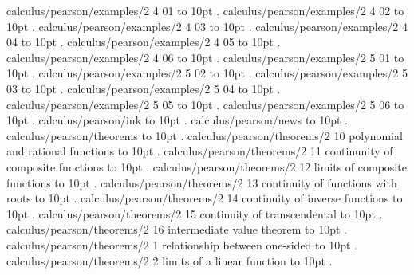 \smallskip
\par\endgroup
\bigskip
calculus/pearson/examples/2 4 01 \leaders\hbox to 10pt {\hss.\hss}  \hfill {}
\smallskip
calculus/pearson/examples/2 4 02 \leaders\hbox to 10pt {\hss.\hss}  \hfill {}
\smallskip
calculus/pearson/examples/2 4 03 \leaders\hbox to 10pt {\hss.\hss}  \hfill {}
\smallskip
calculus/pearson/examples/2 4 04 \leaders\hbox to 10pt {\hss.\hss}  \hfill {}
\smallskip
calculus/pearson/examples/2 4 05 \leaders\hbox to 10pt {\hss.\hss}  \hfill {}
\smallskip
calculus/pearson/examples/2 4 06 \leaders\hbox to 10pt {\hss.\hss}  \hfill {}
\smallskip
calculus/pearson/examples/2 5 01 \leaders\hbox to 10pt {\hss.\hss}  \hfill {}
\smallskip
calculus/pearson/examples/2 5 02 \leaders\hbox to 10pt {\hss.\hss}  \hfill {}
\smallskip
calculus/pearson/examples/2 5 03 \leaders\hbox to 10pt {\hss.\hss}  \hfill {}
\smallskip
calculus/pearson/examples/2 5 04 \leaders\hbox to 10pt {\hss.\hss}  \hfill {}
\smallskip
calculus/pearson/examples/2 5 05 \leaders\hbox to 10pt {\hss.\hss}  \hfill {}
\smallskip
calculus/pearson/examples/2 5 06 \leaders\hbox to 10pt {\hss.\hss}  \hfill {}
\smallskip
calculus/pearson/ink \leaders\hbox to 10pt {\hss.\hss}  \hfill {}
\smallskip
calculus/pearson/news \leaders\hbox to 10pt {\hss.\hss}  \hfill {}
\smallskip
calculus/pearson/theorems \leaders\hbox to 10pt {\hss.\hss}  \hfill {}
\smallskip
calculus/pearson/theorems/2 10 polynomial and rational functions \leaders\hbox to 10pt {\hss.\hss}  \hfill {}
\smallskip
calculus/pearson/theorems/2 11 continunity of composite functions \leaders\hbox to 10pt {\hss.\hss}  \hfill {}
\smallskip
calculus/pearson/theorems/2 12 limits of composite functions \leaders\hbox to 10pt {\hss.\hss}  \hfill {}
\smallskip
calculus/pearson/theorems/2 13 continuity of functions with roots \leaders\hbox to 10pt {\hss.\hss}  \hfill {}
\smallskip
calculus/pearson/theorems/2 14 continuity of inverse functions \leaders\hbox to 10pt {\hss.\hss}  \hfill {}
\smallskip
calculus/pearson/theorems/2 15 continuity of transcendental \leaders\hbox to 10pt {\hss.\hss}  \hfill {}
\smallskip
calculus/pearson/theorems/2 16 intermediate value theorem \leaders\hbox to 10pt {\hss.\hss}  \hfill {}
\smallskip
calculus/pearson/theorems/2 1 relationship between one-sided \leaders\hbox to 10pt {\hss.\hss}  \hfill {}
\smallskip
calculus/pearson/theorems/2 2 limits of a linear function \leaders\hbox to 10pt {\hss.\hss}  \hfill {}

